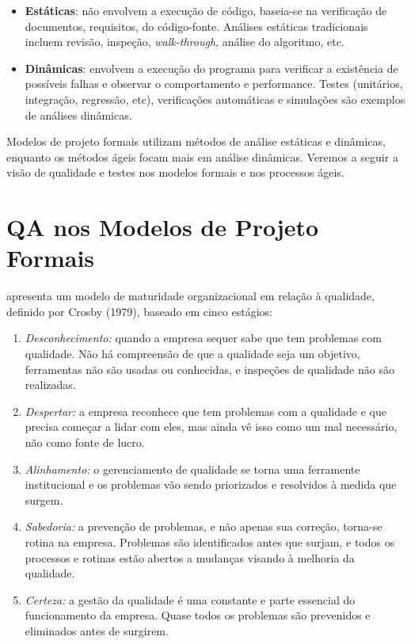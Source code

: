 \documentclass[
	12pt,				%
	openright,			%
	oneside,			%
	a4paper,			%
	english,			%
	brazil,				%
	]{abntex2}
\begin{document}
\begin{itemize}
    \item \textbf{Estáticas}: não envolvem a execução de código, baseia-se na verificação de documentos, requisitos, do código-fonte. Análises estáticas tradicionais incluem revisão, inspeção, \emph{walk-through}, análise do algoritmo, etc.
    \item \textbf{Dinâmicas}: envolvem a execução do programa para verificar a existência de possíveis falhas e observar o comportamento e performance. Testes (unitários, integração, regressão, etc), verificações automáticas e simulações são exemplos de análises dinâmicas.
\end{itemize}


Modelos de projeto formais utilizam métodos de análise estáticas e dinâmicas, enquanto os métodos ágeis focam mais em análise dinâmicas. Veremos a seguir a visão de qualidade e testes nos modelos formais e nos processos ágeis. %

\section{QA nos Modelos de Projeto Formais}
\label{qa-modelos-formais}

 apresenta um modelo de maturidade organizacional em relação à qualidade, definido por Crosby (1979), baseado em cinco estágios:
\begin{enumerate}
    \item \emph{Desconhecimento:} quando a empresa sequer sabe que tem problemas com qualidade. Não há compreensão de que a qualidade seja um objetivo, ferramentas não são usadas ou conhecidas, e inspeções de qualidade não são realizadas.
    \item \emph{Despertar:} a empresa reconhece que tem problemas com a qualidade e que precisa começar a lidar com eles, mas ainda vê isso como um mal necessário, não como fonte de lucro.
    \item \emph{Alinhamento:} o gerenciamento de qualidade se torna uma ferramente institucional e os problemas vão sendo priorizados e resolvidos à medida que surgem.
    \item \emph{Sabedoria:} a prevenção de problemas, e não apenas sua correção, torna-se rotina na empresa. Problemas são identificados antes que surjam, e todos os processos e rotinas estão abertos a mudanças visando à melhoria da qualidade.
    \item \emph{Certeza:} a gestão da qualidade é uma constante e parte essencial do funcionamento da empresa. Quase todos os problemas são prevenidos e eliminados antes de surgirem.
\end{enumerate}
\end{document}
